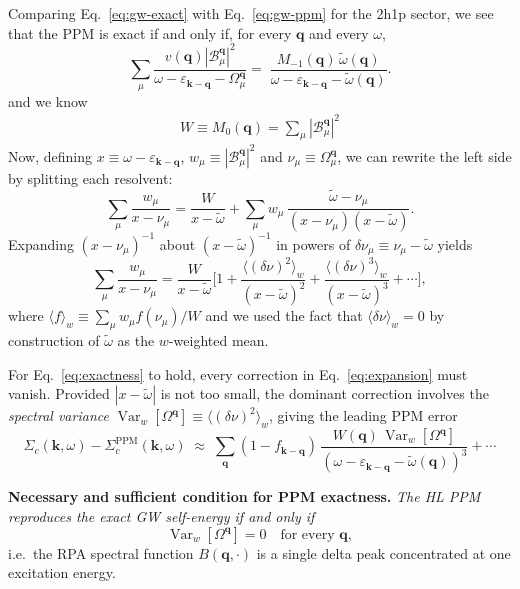 \documentclass[11pt]{article}
\newcommand{\bq}{\mathbf{q}}
\newcommand{\bk}{\mathbf{k}}
\newcommand{\wt}{\tilde{\omega}}
\newcommand{\Om}{\Omega}
\newcommand{\eps}{\varepsilon}
\newcommand{\Sig}{\Sigma}
\begin{document}
Comparing Eq.~\eqref{eq:gw-exact} with Eq.~\eqref{eq:gw-ppm} for the 2h1p sector, we see that the PPM
is exact if and only if, for every $\bq$ and every $\omega$,
\begin{equation}
\sum_\mu \frac{v(\bq)|\mathcal{B}_\mu^\bq|^2}
                 {\omega - \eps_{\bk-\bq} - \Om_\mu^\bq}=\;
  \frac{M_{-1}(\bq)\,\wt(\bq)}
       {\omega - \eps_{\bk-\bq} - \wt(\bq)}.
  \label{eq:exactness}
\end{equation}
and we know
\begin{align}
  W \equiv M_0(\bq) = \sum_\mu |\mathcal{B}_\mu^\bq|^2
\end{align}
Now, defining $x \equiv \omega - \eps_{\bk-\bq}$, $w_\mu \equiv |\mathcal{B}_\mu^\bq|^2$ and $\nu_\mu \equiv \Om_\mu^\bq$, we can rewrite the left side by splitting each resolvent:
\begin{equation}
  \sum_\mu \frac{w_\mu}{x - \nu_\mu}
  = \frac{W}{x - \wt}
    + \sum_\mu w_\mu\,
      \frac{\wt - \nu_\mu}
           {(x-\nu_\mu)(x-\wt)}.
  \label{eq:split}
\end{equation}
Expanding $(x-\nu_\mu)^{-1}$ about $(x-\wt)^{-1}$ in powers of
$\delta\nu_\mu \equiv \nu_\mu - \wt$ yields
\begin{equation}
  \sum_\mu \frac{w_\mu}{x - \nu_\mu}
  = \frac{W}{x-\wt}
    \Biggl[
      1 + \frac{\bigl\langle(\delta\nu)^2\bigr\rangle_w}{(x-\wt)^2}
        + \frac{\bigl\langle(\delta\nu)^3\bigr\rangle_w}{(x-\wt)^3}
        + \cdots
    \Biggr],
  \label{eq:expansion}
\end{equation}
where $\langle f \rangle_w \equiv \sum_\mu w_\mu f(\nu_\mu) / W$ and
we used the fact that $\langle\delta\nu\rangle_w = 0$ by construction of
$\wt$ as the $w$-weighted mean.

For Eq.~\eqref{eq:exactness} to hold, every correction in
Eq.~\eqref{eq:expansion} must vanish.  Provided $|x-\wt|$ is not too
small, the dominant correction involves the \emph{spectral variance}
$\operatorname{Var}_w[\Om^\bq] \equiv \langle(\delta\nu)^2\rangle_w$,
giving the leading PPM error
\begin{equation}
  \Sig_c(\bk,\omega) - \Sig_c^\text{PPM}(\bk,\omega)
  \;\approx\;
  \sum_{\bq}(1-f_{\bk-\bq})\,
    \frac{W(\bq)\,\operatorname{Var}_w[\Om^\bq]}
         {(\omega - \eps_{\bk-\bq} - \wt(\bq))^3}
  + \cdots
  \label{eq:error}
\end{equation}

\medskip
\noindent\textbf{Necessary and sufficient condition for PPM exactness.}
\emph{The HL PPM reproduces the exact GW self-energy if and only if}
\begin{equation}
  \operatorname{Var}_w[\Om^\bq] = 0
  \quad\text{for every }\bq,
  \label{eq:exact-cond}
\end{equation}
i.e.\ the RPA spectral function $B(\bq,\cdot)$ is a single delta peak
concentrated at one excitation energy.
\end{document}
